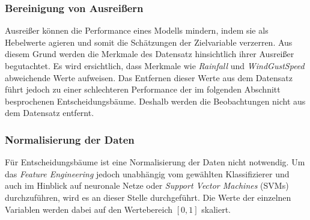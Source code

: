 \subsubsection{Bereinigung von Ausreißern}
Ausreißer können die Performance eines Modells mindern, indem sie als Hebelwerte agieren und somit die Schätzungen der Zielvariable verzerren. Aus diesem Grund werden die Merkmale des Datensatz hinsichtlich ihrer Ausreißer begutachtet. Es wird ersichtlich, dass Merkmale wie \emph{Rainfall} und \emph{WindGustSpeed} abweichende Werte aufweisen. Das Entfernen dieser Werte aus dem Datensatz führt jedoch zu einer schlechteren Performance der im folgenden Abschnitt besprochenen Entscheidungsbäume. Deshalb werden die Beobachtungen nicht aus dem Datensatz entfernt.

\subsubsection{Normalisierung der Daten}
Für Entscheidungsbäume ist eine Normalisierung der Daten nicht notwendig. Um das \emph{Feature Engineering} jedoch unabhängig vom gewählten Klassifizierer und auch im Hinblick auf neuronale Netze oder \emph{Support Vector Machines} (SVMs) durchzuführen, wird es an dieser Stelle durchgeführt. Die Werte der einzelnen Variablen werden dabei auf den Wertebereich $[0, 1]$ skaliert.
 

